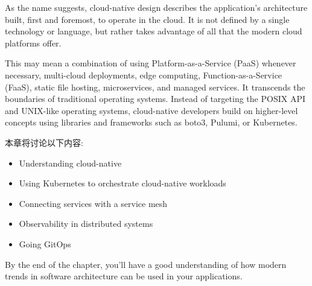 
As the name suggests, cloud-native design describes the application's architecture built, first and foremost, to operate in the cloud. It is not defined by a single technology or language, but rather takes advantage of all that the modern cloud platforms offer. 

This may mean a combination of using Platform-as-a-Service (PaaS) whenever necessary, multi-cloud deployments, edge computing, Function-as-a-Service (FaaS), static file hosting, microservices, and managed services. It transcends the boundaries of traditional operating systems. Instead of targeting the POSIX API and UNIX-like operating systems, cloud-native developers build on higher-level concepts using libraries and frameworks such as boto3, Pulumi, or Kubernetes.


本章将讨论以下内容:

\begin{itemize}
\item 
Understanding cloud-native 

\item 
Using Kubernetes to orchestrate cloud-native workloads

\item 
Connecting services with a service mesh

\item 
Observability in distributed systems

\item 
Going GitOps
\end{itemize}

By the end of the chapter, you'll have a good understanding of how modern trends in software architecture can be used in your applications.